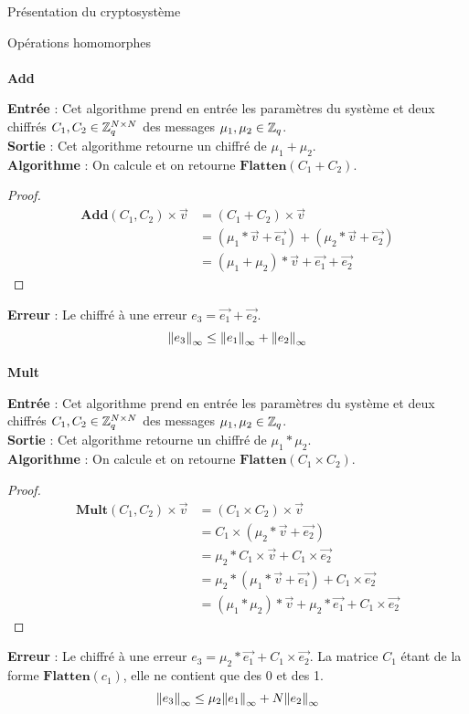 \begin{section}{Présentation du cryptosystème}
\begin{subsection}{Opérations homomorphes}
	\paragraph{}
	\textbf{Add}
	\flushleft
	
	\textbf{Entrée} : Cet algorithme prend en entrée les paramètres du système et deux chiffrés $C_1, C_2 \in \mathbb{Z}_q^{N \times N}$ des messages $\mu_1, \mu_2 \in \mathbb{Z}_q$.\\
	\textbf{Sortie} : Cet algorithme retourne un chiffré de $\mu_1 + \mu_2$.\\
	\textbf{Algorithme} : On calcule et on retourne $\textbf{Flatten}(C_1 + C_2)$.
	\begin{proof}
	\begin{align*}
	\textbf{Add}(C_1, C_2) \times \vec{v} &= (C_1 + C_2) \times \vec{v} \\
	&= (\mu_1 * \vec{v} + \vec{e_1}) + (\mu_2 * \vec{v} + \vec{e_2}) \\
	&= (\mu_1 + \mu_2) * \vec{v} + \vec{e_1} + \vec{e_2}
	\end{align*}
	\end{proof}
\textbf{Erreur} : Le chiffré à une erreur $e_3 = \vec{e_1} + \vec{e_2}$.
\[{\|e_3\|}_{\infty} \leq {\|e_1\|}_{\infty} + {\|e_2\|}_{\infty}\] 
	\paragraph{}
	\textbf{Mult}
	\flushleft
	
	\textbf{Entrée} : Cet algorithme prend en entrée les paramètres du système et deux chiffrés $C_1, C_2 \in \mathbb{Z}_q^{N \times N}$ des messages $\mu_1, \mu_2 \in \mathbb{Z}_q$.\\
	\textbf{Sortie} : Cet algorithme retourne un chiffré de $\mu_1 * \mu_2$. \\
	\textbf{Algorithme} : On calcule et on retourne $\textbf{Flatten}(C_1 \times C_2)$.
	\begin{proof}
	\begin{align*}
	\textbf{Mult}(C_1, C_2) \times \vec{v} &= (C_1 \times C_2) \times \vec{v} \\
	&= C_1 \times (\mu_2 * \vec{v} + \vec{e_2}) \\
	&= \mu_2 * C_1 \times \vec{v} + C_1 \times \vec{e_2} \\
	&= \mu_2 * (\mu_1 * \vec{v} + \vec{e_1}) + C_1 \times \vec{e_2} \\
	&= (\mu_1 * \mu_2) * \vec{v} + \mu_2 * \vec{e_1} + C_1 \times \vec{e_2}
	\end{align*}
	\end{proof}
	\textbf{Erreur} : Le chiffré à une erreur $e_3 = \mu_2 * \vec{e_1} + C_1 \times \vec{e_2}$. La matrice $C_1$ étant de la forme $\textbf{Flatten}(c_1)$, elle ne contient que des 0 et des 1. 
\[{\|e_3\|}_{\infty} \leq \mu_2 {\|e_1\|}_{\infty} + N {\|e_2\|}_{\infty} \]

\end{subsection}
\end{section}
